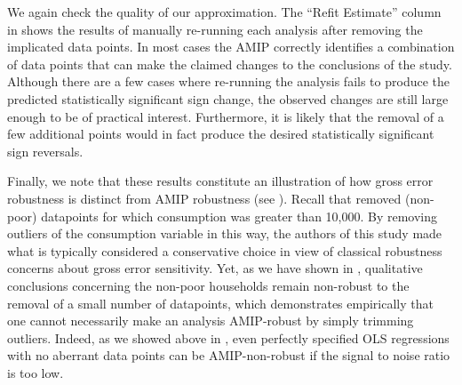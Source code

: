 We again check the quality of our approximation. The ``Refit Estimate'' column
in  shows the results of manually
re-running each analysis after removing the implicated data points. In most
cases the AMIP correctly identifies a combination of data points that can make
the claimed changes to the conclusions of the study. Although there are a few
cases where re-running the analysis fails to produce the predicted statistically
significant sign change, the observed changes are still large enough to be of
practical interest.  Furthermore, it is likely that the removal of a few
additional points would in fact produce the desired statistically significant
sign reversals.

Finally, we note that these results constitute an illustration of how gross
error robustness is distinct from AMIP robustness (see
). Recall that
\citet{angelucci2009indirect} removed (non-poor) datapoints for which
consumption was greater than 10,000. By removing outliers of the consumption
variable in this way, the authors of this study made what is typically
considered a conservative choice in view of classical robustness concerns about
gross error sensitivity. Yet, as we have shown in
, qualitative conclusions concerning the
non-poor households remain non-robust to the removal of a small number of
datapoints, which demonstrates empirically that one cannot necessarily make an
analysis AMIP-robust by simply trimming outliers.  Indeed, as we showed above in
, even perfectly specified OLS regressions with
no aberrant data points can be AMIP-non-robust if the signal to noise ratio is
too low.

